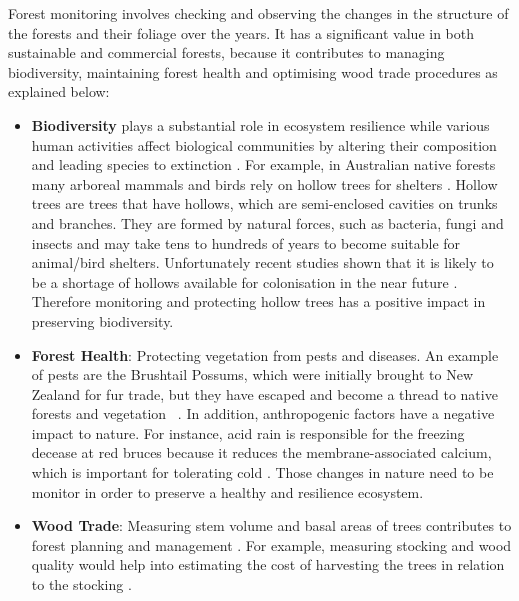 \documentclass{subfiles}
\begin{document}
Forest monitoring involves checking and observing the changes in the structure of the forests and their foliage over the years. It has a significant value in both sustainable and commercial forests, because it contributes to managing biodiversity, maintaining forest health and optimising wood trade procedures as explained below: 
\begin{itemize}
 \item \textbf{Biodiversity} plays a substantial role in ecosystem resilience \cite{Elmqvist2003} while various human activities affect biological communities by altering their composition and leading species to extinction \cite{Hooper2005}.  For example, in Australian native forests many arboreal mammals and birds rely on hollow trees for shelters \cite{Lindenmayer2010}. Hollow trees are trees that have hollows, which are semi-enclosed cavities on trunks and branches. They are formed by natural forces, such as bacteria, fungi and insects and may take tens to hundreds of years to become suitable for animal/bird shelters. Unfortunately recent studies shown that it is likely to be a shortage of hollows available for colonisation in the near future \cite{Goldingay2009}\cite{Gibbons2002}. Therefore monitoring and protecting hollow trees has a positive impact in preserving biodiversity.
 
 \item \textbf{Forest Health}: Protecting vegetation from pests and diseases. An example of pests are the Brushtail Possums, which were initially brought to New Zealand for fur trade, but they have escaped and become a thread to native forests and vegetation ~\cite{DepartementOfConversation2014}. In addition, anthropogenic factors have a negative impact to nature. For instance, acid rain is responsible for the freezing decease at red bruces because it reduces the membrane-associated calcium, which is important for tolerating cold 
 \cite{DeHayes1999}. Those changes in nature need to be monitor in order to preserve a healthy and resilience ecosystem. 
 
 \item \textbf{Wood Trade}:  Measuring stem volume and basal areas of trees contributes to forest planning and management \cite{Holmgren2004}. For example, measuring stocking and wood quality would help into estimating the cost of harvesting the trees in relation to the stocking \cite{Susana2015}.


\end{itemize}
 
\end{document}
